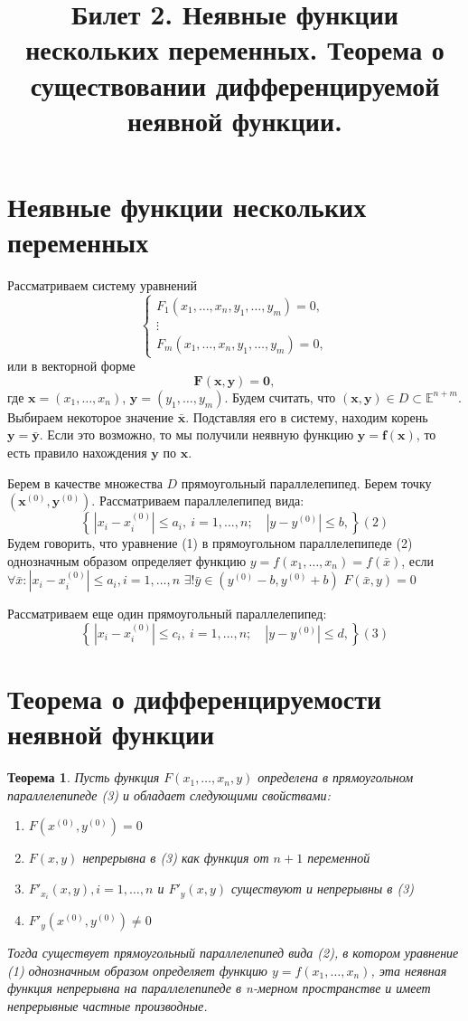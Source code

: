 \documentclass{article}
\title{Билет 2. Неявные функции нескольких переменных. Теорема о существовании
дифференцируемой неявной функции.}
\author{}
\date{}
\theoremstyle{plain}
\newtheorem{theorem}{Теорема}
\theoremstyle{definition}
\theoremstyle{remark}
\begin{document}
\maketitle

\section*{Неявные функции нескольких переменных}
Рассматриваем систему уравнений
\[
\begin{cases}
F_1(x_1,\ldots,x_n,y_1,\ldots,y_m)=0,\\[4pt]
\vdots\\[4pt]
F_m(x_1,\ldots,x_n,y_1,\ldots,y_m)=0,
\end{cases}
\]
или в векторной форме
\[\mathbf{F}(\mathbf{x},\mathbf{y})=\mathbf{0},\]
где \(\mathbf{x}=(x_1,\ldots,x_n)\), \(\mathbf{y}=(y_1,\ldots,y_m)\).
Будем считать, что \((\mathbf{x},\mathbf{y})\in D\subset\mathbb{E}^{n+m}\).
Выбираем некоторое значение \(\bar{\mathbf{x}}\). Подставляя его в систему,
находим корень \(\mathbf{y}=\bar{\mathbf{y}}\). Если это возможно, то
мы получили неявную функцию \(\mathbf{y}=\mathbf{f}(\mathbf{x})\), то есть правило нахождения
\(\mathbf{y}\) по \(\mathbf{x}\).

Берем в качестве множества \(D\) прямоугольный параллелепипед. Берем точку
\((\mathbf{x}^{(0)}, \mathbf{y}^{(0)})\). Рассматриваем параллелепипед вида:
\[\left\{\,|x_i-x_i^{(0)}|\le a_i,\ i=1,\ldots,n;\quad |y-y^{(0)}|\le b,\right\} (2)\]
Будем говорить, что уравнение (1) в прямоугольном параллелепипеде (2)
однозначным образом определяет функцию $y = f(x_1, \ldots, x_n) = f(\bar{x})$, если
$\forall \bar{x}: |x_i - x_i^{(0)}| \le a_i, i = 1, \ldots, n$ $\exists! \bar{y} \in (y^{(0)} - b, y^{(0)} + b)$ 
$F(\bar{x}, y) = 0$

Рассматриваем еще один прямоугольный параллелепипед:
\[\left\{\,|x_i-x_i^{(0)}|\le c_i,\ i=1,\ldots,n;\quad |y-y^{(0)}|\le d,\right\} (3)\]

\section*{Теорема о дифференцируемости неявной функции}
\begin{theorem}
Пусть функция \(F(x_1,\ldots,x_n,y)\) определена в прямоугольном параллелепипеде (3)
и обладает следующими свойствами:
\begin{enumerate}
    \item $F(x^{(0)}, y^{(0)}) = 0$
    \item $F(x, y)$ непрерывна в (3) как функция от $n + 1$ переменной
    \item $F'_{x_i}(x, y), i = 1, \ldots, n$ и $F'_y(x, y)$ существуют и непрерывны в (3)
    \item $F'_y(x^{(0)}, y^{(0)}) \neq 0$
\end{enumerate}
Тогда существует прямоугольный параллелепипед вида (2), в котором уравнение
(1) однозначным образом определяет функцию \(y = f(x_1, \ldots, x_n)\), эта
неявная функция непрерывна на параллелепипеде в n-мерном пространстве и
имеет непрерывные частные производные.

\end{theorem}
\end{document}
